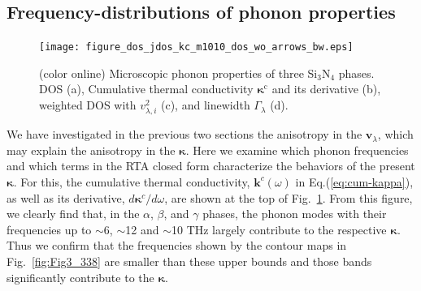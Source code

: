 \documentclass[twocolumn,amsmath,amssymb,a4paper,prb,superscriptaddress,floatfix]{revtex4-1}
\begin{document}
\subsection{Frequency-distributions of phonon properties}

\begin{figure}[ht]
 \begin{center}
	 \texttt{[image: figure\_dos\_jdos\_kc\_m1010\_dos\_wo\_arrows\_bw.eps]}
  \caption{(color online) Microscopic phonon properties of three Si$_3$N$_4$
	  phases. DOS (a), Cumulative thermal conductivity $\mathbf{\kappa}^\text{c}$ and its derivative
	  (b), weighted DOS with $v_{\lambda,i}^2$ (c), and linewidth $\Gamma_\lambda$ (d).
  \label{fig:Fig5_338_rev} }
 \end{center}
\end{figure}

We have investigated in the previous two sections the anisotropy in the
$\mathbf{v}_\lambda$, which may explain the anisotropy in the
$\boldsymbol{\kappa}$. Here we examine which phonon frequencies and which terms
in the RTA closed form characterize the behaviors of the present  $\boldsymbol{\kappa}$.
For this, the cumulative thermal conductivity,  $\boldsymbol{k}^c(\omega)$ in
Eq.(\ref{eq:cum-kappa}), as well as its derivative,
$d\boldsymbol{\kappa}^c/d\omega$, are shown at the top of
Fig.~\ref{fig:Fig5_338_rev}.  From this figure, we clearly find that, in the
$\alpha$, $\beta$, and $\gamma$ phases, the phonon modes with their frequencies
up to $\sim$6, $\sim$12 and $\sim$10 THz largely contribute to the respective
$\boldsymbol{\kappa}$. Thus we confirm that the frequencies shown by the contour
maps in Fig.~\ref{fig:Fig3_338} are smaller than these upper bounds and those
bands significantly contribute to the $\boldsymbol{\kappa}$.  
\end{document}
